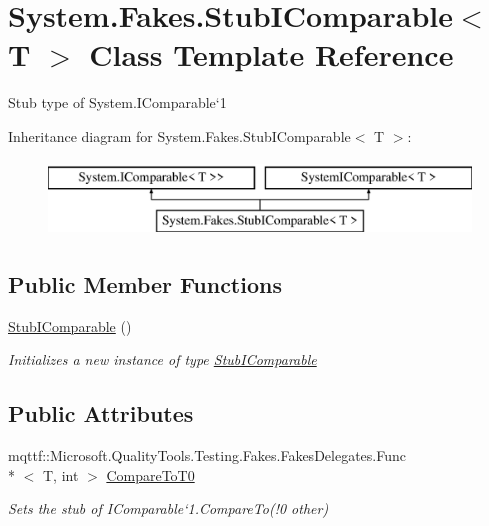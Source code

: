 \hypertarget{class_system_1_1_fakes_1_1_stub_i_comparable_3_01_t_01_4}{\section{System.\-Fakes.\-Stub\-I\-Comparable$<$ T $>$ Class Template Reference}
\label{class_system_1_1_fakes_1_1_stub_i_comparable_3_01_t_01_4}
}


Stub type of System.\-I\-Comparable`1 


Inheritance diagram for System.\-Fakes.\-Stub\-I\-Comparable$<$ T $>$\-:\begin{figure}[H]
\begin{center}
\leavevmode
\includegraphics[height=2.000000cm]{class_system_1_1_fakes_1_1_stub_i_comparable_3_01_t_01_4}
\end{center}
\end{figure}
\subsection*{Public Member Functions}
\begin{DoxyCompactItemize}
\item 
\hyperlink{class_system_1_1_fakes_1_1_stub_i_comparable_3_01_t_01_4_adb5e9b24fbc4b82122e69d65c103ddef}{Stub\-I\-Comparable} ()
\begin{DoxyCompactList}\small\item\em Initializes a new instance of type \hyperlink{class_system_1_1_fakes_1_1_stub_i_comparable}{Stub\-I\-Comparable}\end{DoxyCompactList}\end{DoxyCompactItemize}
\subsection*{Public Attributes}
\begin{DoxyCompactItemize}
\item 
mqttf\-::\-Microsoft.\-Quality\-Tools.\-Testing.\-Fakes.\-Fakes\-Delegates.\-Func\\*
$<$ T, int $>$ \hyperlink{class_system_1_1_fakes_1_1_stub_i_comparable_3_01_t_01_4_a7a927bcf4544065f5e3b9b91a37b364a}{Compare\-To\-T0}
\begin{DoxyCompactList}\small\item\em Sets the stub of I\-Comparable`1.Compare\-To(!0 other)\end{DoxyCompactList}\end{DoxyCompactItemize}


